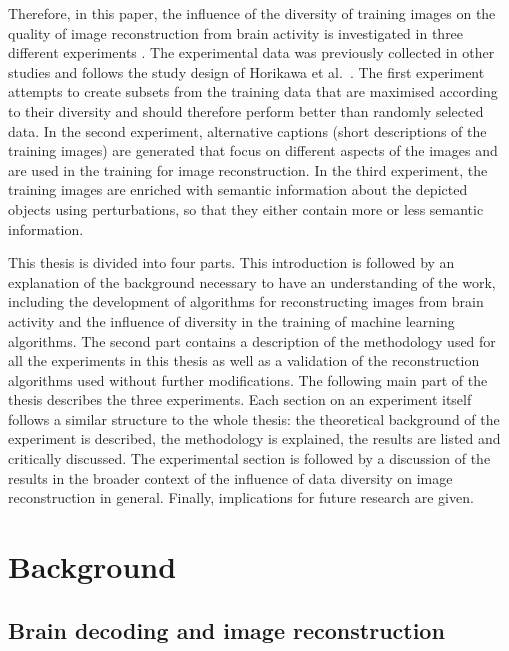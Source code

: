 Therefore, in this paper, the influence of the diversity of training images on the quality of image reconstruction from brain activity is investigated in three different experiments . The experimental data was previously collected in other studies and follows the study design of Horikawa et al.~\cite{horikawaGenericDecodingSeen2017}. The first experiment attempts to create subsets from the training data that are maximised according to their diversity and should therefore perform better than randomly selected data. In the second experiment, alternative captions (short descriptions of the training images) are generated that focus on different aspects of the images and are used in the training for image reconstruction. In the third experiment, the training images are enriched with semantic information about the depicted objects using perturbations, so that they either contain more or less semantic information.

This thesis is divided into four parts. This introduction is followed by an explanation of the background necessary to have an understanding of the work, including the development of algorithms for reconstructing images from brain activity and the influence of diversity in the training of machine learning algorithms. The second part contains a description of the methodology used for all the experiments in this thesis as well as a validation of the reconstruction algorithms used without further modifications. The following main part of the thesis describes the three experiments. Each section on an experiment itself follows a similar structure to the whole thesis: the theoretical background of the experiment is described, the methodology is explained, the results are listed and critically discussed. The experimental section is followed by a discussion of the results in the broader context of the influence of data diversity on image reconstruction in general. Finally, implications for future research are given.


\section{Background}

\subsection{Brain decoding and image reconstruction}

